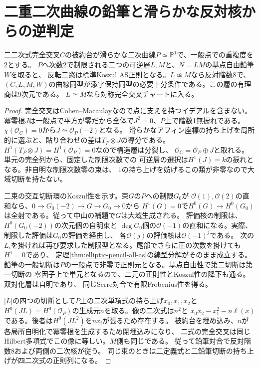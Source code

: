 \section{二重二次曲線の鉛筆と滑らかな反対核からの逆判定}
\label{sec:ribbon-graph-recognition}
\begin{theorem}[二重二次曲線上の全次数認証と同型]\label{thm:conic-ribbon-as}
二二次式完全交叉$C$の被約台が滑らかな二次曲線$P\simeq\mathbb P^1$で、一般点での重複度を2とする。
$P$へ次数2で制限される二つの可逆層$L,M$と、$N=LM$の基点自由鉛筆$W$を取ると、
反転二窓は標準Koszul AS正則となる。$L\not\simeq M$なら反対階数8で、
$(C,L,M,W)$の曲線同型が添字保持同型の必要十分条件である。この層の有理商は9次元である。
$L\simeq M$なら対称完全交叉チャートに入る。
\end{theorem}
\begin{proof}
完全交叉はCohen--Macaulayなので点に支えを持つイデアルを含まない。
冪零根$J$は一般点で平方が零だから全体で$J^2=0$、$P$上で階数1無捩れである。
$\chi(\mathcal O_C)=0$から$J\simeq\mathcal O_P(-2)$となる。
滑らかなアフィン座標の持ち上げを局所的に選ぶと、貼り合わせの差は$T_P\otimes J$の導分である。
$H^1(T_P\otimes J)=H^1(\mathcal O_P)=0$なので構造層は分裂し、
$\mathcal O_C=\mathcal O_P\oplus J$と取れる。単元の完全列から、固定した制限次数での
可逆層の選択は$H^1(J)=k$の捩れとなる。非自明な制限次数零の束は、
$1$の持ち上げを妨げるこの類が非零なので大域切断を持たない。

二束の交互切断環のKoszul性を示す。束$G$の$P$への制限$G_0$が
$\mathcal O(1),\mathcal O(2)$の直和なら、$0\to G_0(-2)\to G\to G_0\to0$から
$H^1(G)=0$で$H^0(G)\to H^0(G_0)$は全射である。従って中山の補題で$G$は大域生成される。
評価核の制限は、$H^0(G_0(-2))$の次元個の自明束と
$\deg G_0$個の$\mathcal O(-1)$の直和になる。実際、制限した評価は$G_0$の評価を経由し、
各$\mathcal O(j)$の評価核は$\mathcal O(-1)^j$である。
次の$L_i$を掛ければ再び要求した制限型となる。尾部でさらに正の次数を掛けても$H^1=0$であり、
定理\ref{thm:elliptic-pencil-all-as}の線型分解がそのまま成立する。
鉛筆の一般切断は$P$の一般点で非零で正則元となる。基点自由性で第二切断は第一切断の
零因子上で単元となるので、二元の正則性とKoszul性の降下も通る。双対化層は自明であり、
同じSerre対合で有限Frobenius性を得る。

$|L|$の四つの切断として$P$上の二次単項式の持ち上げ$x_0,x_1,x_2$と
$H^0(JL)=H^0(\mathcal O_P)$の生成元$n$を取る。像の二次式は$n^2$と
$x_0x_2-x_1^2-n\ell(x)$である。後者は$H^0(JL^2)$を$n x_i$が張るため存在する。
被約台を埋め込み、$n$が各局所自明化で冪零根を生成するため閉埋込みになり、
二式の完全交叉は同じHilbert多項式でこの像に等しい。$M$側も同じである。
従って鉛筆対合で反対階数8および両側の二次核が従う。
同じ束のときは二定義式と二鉛筆切断の持ち上げが四二次式の正則列になる。


\end{proof}
